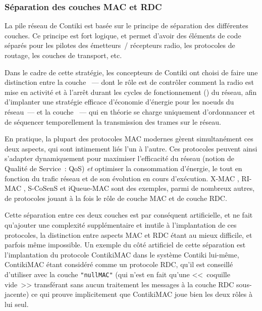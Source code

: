 \subsubsection{Séparation des couches MAC et RDC}
\label{ParContikiMACRDC}

La pile réseau de Contiki est basée sur le principe de séparation des
différentes couches. Ce principe est fort logique, et permet d'avoir
des éléments de code séparés pour les pilotes des émetteurs~/ récepteurs
radio, les protocoles de routage, les couches de transport, etc.

Dans le cadre de cette stratégie, les concepteurs de Contiki ont choisi
de faire une distinction entre la couche ~--- dont le rôle est de contrôler comment la radio est mise
en activité et à l'arrêt durant les cycles de fonctionnement () du réseau, afin d'implanter une stratégie efficace d'économie
d'énergie pour les noeuds du réseau~--- et la couche ~--- qui en théorie se charge uniquement d'ordonnancer
et de séquencer temporellement la transmission des trames sur le réseau.

En pratique, la plupart des protocoles MAC modernes gèrent simultanément
ces deux aspects, qui sont intimement liés l'un à l'autre. Ces protocoles
peuvent ainsi s'adapter dynamiquement pour maximiser l'efficacité du
réseau (notion de Qualité de Service~: QoS) \emph{et} optimiser
la consommation d'énergie, le tout en fonction du trafic réseau et
de son évolution en cours d'exécution. X-MAC \cite{XMAC}, RI-MAC
\cite{RIMAC}, S-CoSenS \cite{CosensJournal} et iQueue-MAC \cite{iQueueMAC}
sont des exemples, parmi de nombreux autres, de protocoles jouant à la fois
le rôle de couche MAC et de couche RDC.

Cette séparation entre ces deux couches est par conséquent artificielle,
et ne fait qu'ajouter une complexité supplémentaire et inutile à
l'implantation de ces protocoles, la distinction entre aspects MAC
et RDC étant au mieux difficile, et parfois même impossible. Un exemple
du côté artificiel de cette séparation est l'implantation du protocole
ContikiMAC dans le système Contiki lui-même, ContikiMAC étant considéré
comme un protocole RDC, qu'il est conseillé d'utiliser avec la couche
\texttt{"nullMAC"} (qui n'est en fait qu'une <<~coquille vide~>> transférant
sans aucun traitement les messages à la couche RDC sous-jacente) ce qui
prouve implicitement que ContikiMAC joue bien les deux rôles à lui seul.


